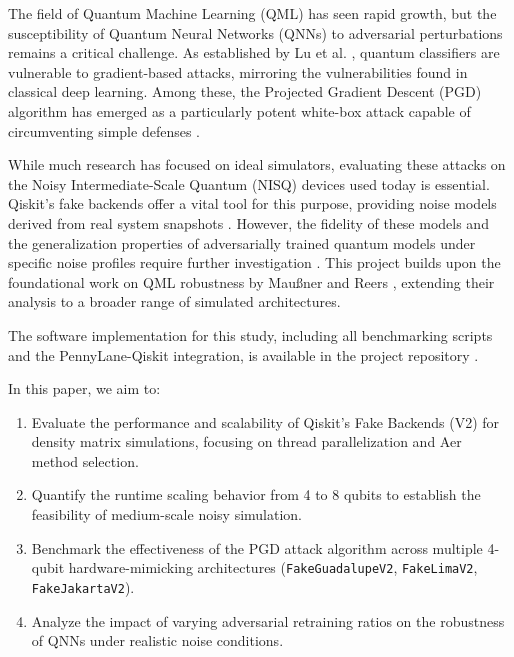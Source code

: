 The field of Quantum Machine Learning (QML) has seen rapid growth, but the susceptibility of Quantum Neural Networks (QNNs) to adversarial perturbations remains a critical challenge. As established by Lu et al. \cite{Lu2020}, quantum classifiers are vulnerable to gradient-based attacks, mirroring the vulnerabilities found in classical deep learning. Among these, the Projected Gradient Descent (PGD) algorithm has emerged as a particularly potent white-box attack capable of circumventing simple defenses \cite{Weber2025}. 

While much research has focused on ideal simulators, evaluating these attacks on the Noisy Intermediate-Scale Quantum (NISQ) devices used today is essential. Qiskit's fake backends offer a vital tool for this purpose, providing noise models derived from real system snapshots \cite{Ren2024, QiskitAer}. However, the fidelity of these models and the generalization properties of adversarially trained quantum models under specific noise profiles require further investigation \cite{Du2024}. This project builds upon the foundational work on QML robustness by Mau{\ss}ner and Reers \cite{Maussner2025}, extending their analysis to a broader range of simulated architectures.

The software implementation for this study, including all benchmarking scripts and the PennyLane-Qiskit integration, is available in the project repository \cite{qml_cysec_repo}.

In this paper, we aim to:
\begin{enumerate}
    \item Evaluate the performance and scalability of Qiskit's Fake Backends (V2) for density matrix simulations, focusing on thread parallelization and Aer method selection.
    \item Quantify the runtime scaling behavior from 4 to 8 qubits to establish the feasibility of medium-scale noisy simulation.
    \item Benchmark the effectiveness of the PGD attack algorithm across multiple 4-qubit hardware-mimicking architectures (\texttt{FakeGuadalupeV2}, \texttt{FakeLimaV2}, \texttt{FakeJakartaV2}).
    \item Analyze the impact of varying adversarial retraining ratios on the robustness of QNNs under realistic noise conditions.
\end{enumerate}
